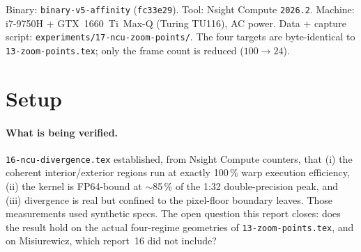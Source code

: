 \documentclass[
	english,
	letterpaper, oneside
]{article}
\begin{document}
\templatePagecfg
\templateFinalcfg

\inserttitle

\begin{center}\small\textsf{%
Binary: \texttt{binary-v5-affinity} (\texttt{fc33e29}). Tool: Nsight Compute
\texttt{2026.2}. Machine: i7-9750H + GTX~1660~Ti~Max-Q (Turing TU116), AC power.
Data + capture script: \texttt{experiments/17-ncu-zoom-points/}. The four targets
are byte-identical to \texttt{13-zoom-points.tex}; only the frame count is reduced
($100\!\to\!24$).%
}\end{center}

\begin{abstract}
Report~\texttt{16} measured, on synthetic specs, that the coherent regions GPU
affinity routes to the device run divergence-free and FP64-bound.
This report verifies that on the four \texttt{13-zoom-points.tex}
geometries (outside, inside, Misiurewicz, seahorse) --- the real workload
shapes --- and adds Misiurewicz, which report~16 never covered. Same
\texttt{ncu} methodology: GPU-only capture so the device sees every region type;
the same four report-13 targets, with frame count reduced $100\to24$ (warp and
FP64 metrics are rates, independent of frame count). The result reproduces
exactly: leaves of 480$\times$270 and larger run at 99.7--100\,\% warp
execution efficiency in every regime (0\,\% below 70\,\%), while divergence
(down to 38\,\%) is entirely confined to the 240$\times$135
pixel-floor leaves (mean $\sim$89\,\%, 8--14\,\% below 70\,\%). The inside point
is FP64-bound at 85.6\,\% of peak ($\sim$110 of 129~GFLOPS at 1.34~GHz),
matching report~16 to the decimal. Even Misiurewicz's thin filaments obey the
rule: the filament-crossing floor leaves diverge, the big regions do not.
Divergence is confined to the floor tier by the subdivision rule itself ---
independent of geometry.
\end{abstract}

\section{Setup}

\paragraph{What is being verified.} \texttt{16-ncu-divergence.tex} established,
from Nsight Compute counters, that (i) the coherent interior/exterior regions run
at exactly 100\,\% warp execution efficiency, (ii) the kernel is FP64-bound at
$\sim$85\,\% of the 1:32 double-precision peak, and (iii) divergence is real but
confined to the pixel-floor boundary leaves. Those measurements used synthetic
specs. The open question this report closes: does the result hold on the
actual four-regime geometries of \texttt{13-zoom-points.tex}, and on
Misiurewicz, which report~16 did not include?
\end{document}

